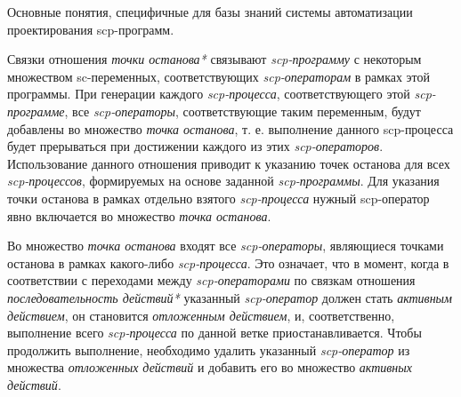Основные понятия, специфичные для базы знаний системы автоматизации проектирования scp-программ.
\begin{SCn}
\end{SCn}

Связки отношения \textit{точки останова*} связывают \textit{scp-программу} с некоторым множеством sc-переменных, соответствующих \textit{scp-операторам} в рамках этой программы. При генерации каждого \textit{scp-процесса}, соответствующего этой \textit{scp-программе}, все \textit{scp-операторы}, соответствующие таким переменным, будут добавлены во множество \textit{точка останова}, т. е. выполнение данного scp-процесса будет прерываться при достижении каждого из этих \textit{scp-операторов}.
Использование данного отношения приводит к указанию точек останова для всех \textit{scp-процессов}, формируемых на основе заданной \textit{\mbox{scp-программы}}. Для указания точки останова в рамках отдельно взятого \textit{scp-процесса} нужный scp-оператор явно включается во множество \textit{точка останова}.

\begin{SCn}
\end{SCn}

Во множество \textit{точка останова} входят все \textit{scp-операторы}, являющиеся точками останова в рамках какого-либо \textit{scp-процесса}. Это означает, что в момент, когда в соответствии с переходами между \textit{scp-операторами} по связкам отношения \textit{последовательность действий*} указанный \textit{scp-оператор} должен стать \textit{активным действием}, он становится \textit{отложенным действием}, и, соответственно, выполнение всего \textit{scp-процесса} по данной ветке приостанавливается. Чтобы продолжить выполнение, необходимо удалить указанный \textit{\mbox{scp-оператор}} из множества \textit{отложенных действий} и добавить его во множество \textit{активных действий}.

